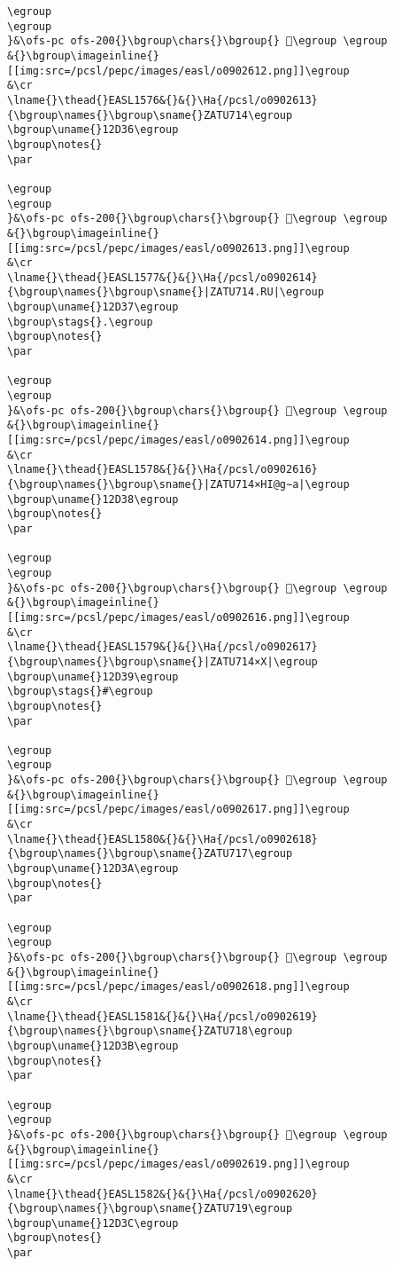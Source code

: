 \begin{verbatim}
\egroup
\egroup
}&\ofs-pc ofs-200{}\bgroup\chars{}\bgroup{} 𒴵\egroup \egroup
&{}\bgroup\imageinline{}[[img:src=/pcsl/pepc/images/easl/o0902612.png]]\egroup
&\cr
\lname{}\thead{}EASL1576&{}&{}\Ha{/pcsl/o0902613}{\bgroup\names{}\bgroup\sname{}ZATU714\egroup
\bgroup\uname{}12D36\egroup
\bgroup\notes{}
\par 

\egroup
\egroup
}&\ofs-pc ofs-200{}\bgroup\chars{}\bgroup{} 𒴶\egroup \egroup
&{}\bgroup\imageinline{}[[img:src=/pcsl/pepc/images/easl/o0902613.png]]\egroup
&\cr
\lname{}\thead{}EASL1577&{}&{}\Ha{/pcsl/o0902614}{\bgroup\names{}\bgroup\sname{}|ZATU714.RU|\egroup
\bgroup\uname{}12D37\egroup
\bgroup\stags{}.\egroup
\bgroup\notes{}
\par 

\egroup
\egroup
}&\ofs-pc ofs-200{}\bgroup\chars{}\bgroup{} 𒴷\egroup \egroup
&{}\bgroup\imageinline{}[[img:src=/pcsl/pepc/images/easl/o0902614.png]]\egroup
&\cr
\lname{}\thead{}EASL1578&{}&{}\Ha{/pcsl/o0902616}{\bgroup\names{}\bgroup\sname{}|ZATU714×HI@g∼a|\egroup
\bgroup\uname{}12D38\egroup
\bgroup\notes{}
\par 

\egroup
\egroup
}&\ofs-pc ofs-200{}\bgroup\chars{}\bgroup{} 𒴸\egroup \egroup
&{}\bgroup\imageinline{}[[img:src=/pcsl/pepc/images/easl/o0902616.png]]\egroup
&\cr
\lname{}\thead{}EASL1579&{}&{}\Ha{/pcsl/o0902617}{\bgroup\names{}\bgroup\sname{}|ZATU714×X|\egroup
\bgroup\uname{}12D39\egroup
\bgroup\stags{}#\egroup
\bgroup\notes{}
\par 

\egroup
\egroup
}&\ofs-pc ofs-200{}\bgroup\chars{}\bgroup{} 𒴹\egroup \egroup
&{}\bgroup\imageinline{}[[img:src=/pcsl/pepc/images/easl/o0902617.png]]\egroup
&\cr
\lname{}\thead{}EASL1580&{}&{}\Ha{/pcsl/o0902618}{\bgroup\names{}\bgroup\sname{}ZATU717\egroup
\bgroup\uname{}12D3A\egroup
\bgroup\notes{}
\par 

\egroup
\egroup
}&\ofs-pc ofs-200{}\bgroup\chars{}\bgroup{} 𒴺\egroup \egroup
&{}\bgroup\imageinline{}[[img:src=/pcsl/pepc/images/easl/o0902618.png]]\egroup
&\cr
\lname{}\thead{}EASL1581&{}&{}\Ha{/pcsl/o0902619}{\bgroup\names{}\bgroup\sname{}ZATU718\egroup
\bgroup\uname{}12D3B\egroup
\bgroup\notes{}
\par 

\egroup
\egroup
}&\ofs-pc ofs-200{}\bgroup\chars{}\bgroup{} 𒴻\egroup \egroup
&{}\bgroup\imageinline{}[[img:src=/pcsl/pepc/images/easl/o0902619.png]]\egroup
&\cr
\lname{}\thead{}EASL1582&{}&{}\Ha{/pcsl/o0902620}{\bgroup\names{}\bgroup\sname{}ZATU719\egroup
\bgroup\uname{}12D3C\egroup
\bgroup\notes{}
\par 


\end{verbatim}
